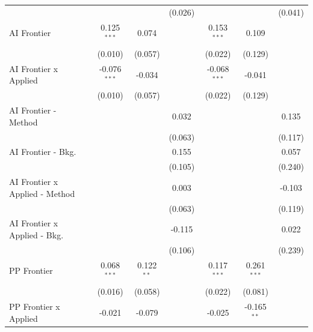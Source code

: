 \begin{tabular}{lcccccc}
                                  &                &                & (0.026)        &                &                & (0.041)\\   
   AI Frontier                    & 0.125$^{***}$  & 0.074          &                & 0.153$^{***}$  & 0.109          &   \\   
                                  & (0.010)        & (0.057)        &                & (0.022)        & (0.129)        &   \\   
   AI Frontier x Applied          & -0.076$^{***}$ & -0.034         &                & -0.068$^{***}$ & -0.041         &   \\   
                                  & (0.010)        & (0.057)        &                & (0.022)        & (0.129)        &   \\   
   AI Frontier - Method           &                &                & 0.032          &                &                & 0.135\\   
                                  &                &                & (0.063)        &                &                & (0.117)\\   
   AI Frontier - Bkg.             &                &                & 0.155          &                &                & 0.057\\   
                                  &                &                & (0.105)        &                &                & (0.240)\\   
   AI Frontier x Applied - Method &                &                & 0.003          &                &                & -0.103\\   
                                  &                &                & (0.063)        &                &                & (0.119)\\   
   AI Frontier x Applied - Bkg.   &                &                & -0.115         &                &                & 0.022\\   
                                  &                &                & (0.106)        &                &                & (0.239)\\   
   PP Frontier                    & 0.068$^{***}$  & 0.122$^{**}$   &                & 0.117$^{***}$  & 0.261$^{***}$  &   \\   
                                  & (0.016)        & (0.058)        &                & (0.022)        & (0.081)        &   \\   
   PP Frontier x Applied          & -0.021         & -0.079         &                & -0.025         & -0.165$^{**}$  &   \\   

\end{tabular}
